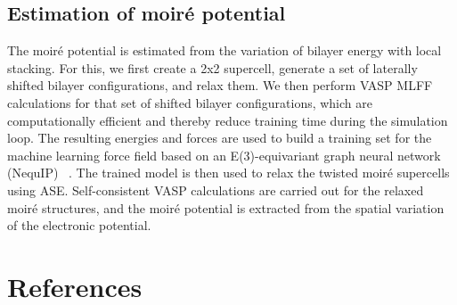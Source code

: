 \documentclass[aps, preprint, prb,]{revtex4-2}
\begin{document}
\subsection{Estimation of moir\'e potential}
The moir\'e potential is estimated from the variation of bilayer energy with local stacking. For this, we first create a 2x2 supercell, generate a set of laterally shifted bilayer configurations, and relax them. We then perform VASP MLFF calculations for that set of shifted bilayer configurations, which are computationally efficient and thereby reduce training time during the simulation loop. The resulting energies and forces are used to build a training set for the machine learning force field based on an E(3)-equivariant graph neural network (NequIP) ~\cite{Batzner2022NequIP}. The trained model is then used to relax the twisted moir\'e supercells using ASE. Self-consistent VASP calculations are carried out for the relaxed moir\'e structures, and the moir\'e potential is extracted from the spatial variation of the electronic potential.

\section*{References}


\end{document}
